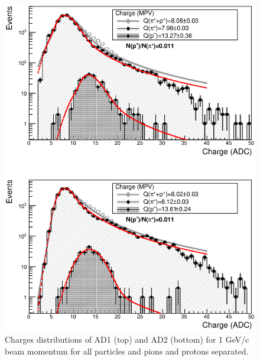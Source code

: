 	\begin{figure}[hb!]
	  \begin{center}
	\includegraphics[scale=0.50]{./images/time/1GeV/NoteQ.eps}%
	\caption{
	Charges distributions of AD1 (top) and AD2 (bottom) for 1 GeV/c beam momentum for all particles and pions and protons separated.
	}
	\label{figure:Q_1GeV}
	  \end{center}
	\end{figure}
	
